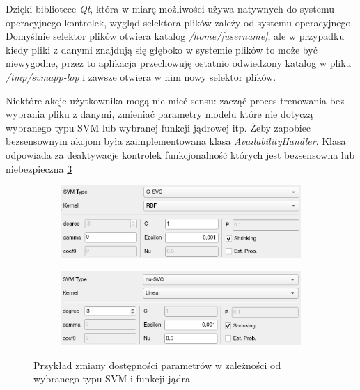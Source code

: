 \documentclass[paper=a4, fontsize=11pt]{scrartcl} %
\numberwithin{equation}{section} %
\numberwithin{figure}{section} %
\begin{document}
    \par Dzięki bibliotece \textit{Qt}, która w miarę możliwości używa natywnych do systemu
    operacyjnego kontrolek, wygląd selektora plików zależy od systemu operacyjnego. Domyślnie
    selektor plików otwiera katalog \textit{/home/[username]}, ale w przypadku kiedy pliki z
    danymi znajdują się głęboko w systemie plików to może być niewygodne, przez to aplikacja
    przechowuję ostatnio odwiedzony katalog w pliku \textit{/tmp/svmapp-lop} i zawsze otwiera w
    nim nowy selektor plików.

    \par Niektóre akcje użytkownika mogą nie mieć sensu: zacząć proces trenowania bez wybrania
    pliku z danymi, zmieniać parametry modelu które nie dotyczą wybranego typu SVM lub
    wybranej funkcji jądrowej itp. Żeby zapobiec bezsensownym akcjom była zaimplementowana
    klasa \textit{AvailabilityHandler}. Klasa odpowiada za deaktywacje kontrolek funkcjonalność
    których jest bezsensowna lub niebezpieczna \ref{fig:availability_ex} 


    \begin{figure}[h!]
        \begin{subfigure}{.5\textwidth}
            \centering
            \includegraphics[width=.95\linewidth]{img/svm_app_param_ex1.png}
            \label{fig:availability_ex1}
        \end{subfigure}%
        \begin{subfigure}{.5\textwidth}
            \centering
            \includegraphics[width=.95\linewidth]{img/svm_app_param_ex2.png}
            \label{fig:availability_ex2}
        \end{subfigure}
        \caption{Przykład zmiany dostępności parametrów w zależności od wybranego typu SVM i
        funkcji jądra}
        \label{fig:availability_ex}
    \end{figure}
\end{document}
